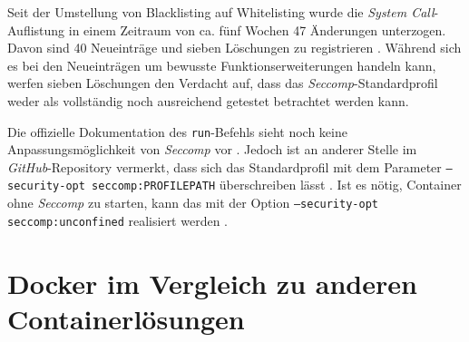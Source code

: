 \documentclass[../main.tex]{subfiles}
\begin{document}
			Seit der Umstellung von Blacklisting auf Whitelisting wurde die \emph{System Call}-Auflistung in einem Zeitraum von ca. fünf Wochen 47 Änderungen unterzogen. Davon sind 40 Neueinträge und sieben Löschungen zu registrieren \cite{githubSeccompProfileHistory}. Während sich es bei den Neueinträgen um bewusste Funktionserweiterungen handeln kann, werfen sieben Löschungen den Verdacht auf, dass das \emph{Seccomp}-Standardprofil weder als vollständig noch ausreichend getestet betrachtet werden kann.

			Die offizielle Dokumentation des \texttt{run}-Befehls sieht noch keine Anpassungsmöglichkeit von \emph{Seccomp} vor \cite{dockerRun}. Jedoch ist an anderer Stelle im \emph{GitHub}-Repository vermerkt, dass sich das Standardprofil mit dem Parameter \texttt{--security-opt seccomp:PROFILEPATH} überschreiben lässt \cite{githubSeccompDoc}. Ist es nötig, Container ohne \emph{Seccomp} zu starten, kann das mit der Option \texttt{--security-opt seccomp:unconfined} realisiert werden \cite{docker110Security}.

	\section{Docker im Vergleich zu anderen Containerlösungen}



\end{document}
